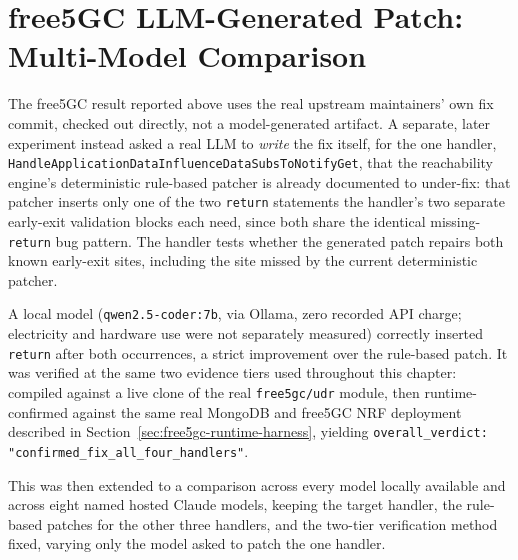 \documentclass[12pt,a4paper]{report}
\begin{document}
\section{free5GC LLM-Generated Patch: Multi-Model Comparison}
\label{sec:free5gc-llm-patch-sweep}

The free5GC result reported above uses the real upstream maintainers' own fix commit, checked out directly, not a model-generated artifact. A separate, later experiment instead asked a real LLM to \emph{write} the fix itself, for the one handler, \texttt{HandleApplicationDataInfluenceDataSubsToNotifyGet}, that the reachability engine's deterministic rule-based patcher is already documented to under-fix: that patcher inserts only one of the two \texttt{return} statements the handler's two separate early-exit validation blocks each need, since both share the identical missing-\texttt{return} bug pattern. The handler tests whether the generated patch repairs both known early-exit sites, including the site missed by the current deterministic patcher.

A local model (\texttt{qwen2.5-coder:7b}, via Ollama, zero recorded API charge; electricity and hardware use were not separately measured) correctly inserted \texttt{return} after both occurrences, a strict improvement over the rule-based patch. It was verified at the same two evidence tiers used throughout this chapter: compiled against a live clone of the real \texttt{free5gc/udr} module, then runtime-confirmed against the same real MongoDB and free5GC NRF deployment described in Section~\ref{sec:free5gc-runtime-harness}, yielding \texttt{overall\_verdict: "confirmed\_fix\_all\_four\_handlers"}.

This was then extended to a comparison across every model locally available and across eight named hosted Claude models, keeping the target handler, the rule-based patches for the other three handlers, and the two-tier verification method fixed, varying only the model asked to patch the one handler.
\end{document}
